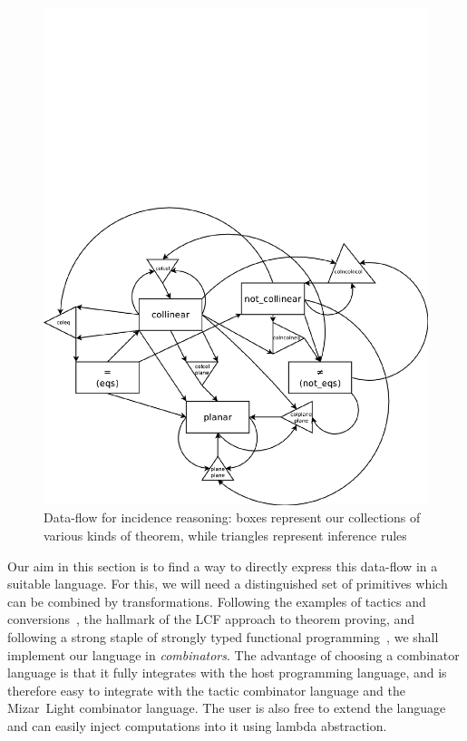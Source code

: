 \begin{figure}
\centering\includegraphics[scale=0.5]{automation/DataFlow}
\caption{Data-flow for incidence reasoning: boxes represent our collections of various kinds of theorem, while triangles represent inference rules}
\label{fig:DataFlow}
\end{figure}

Our aim in this section is to find a way to directly express this data-flow in a suitable language. For this, we will need a distinguished set of primitives which can be combined by transformations. Following the examples of tactics and conversions~\cite{Tactics}, the hallmark of the LCF approach to theorem proving, and following a strong staple of strongly typed functional programming~\cite{CombinatorLanguages}, we shall implement our language in \emph{combinators}. The advantage of choosing a combinator language is that it fully integrates with the host programming language, and is therefore easy to integrate with the tactic combinator language and the Mizar~Light combinator language. The user is also free to extend the language and can easily inject computations into it using lambda abstraction.

